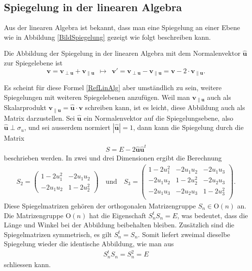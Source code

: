 \subsection{Spiegelung in der linearen Algebra}
Aus der linearen Algebra ist bekannt, dass man eine Spiegelung an einer Ebene wie in Abbildung \ref{BildSpiegelung} gezeigt wie folgt beschreiben kann.
\begin{definition}
	Die Abbildung der Spiegelung in der linearen Algebra mit dem Normalenvektor $\mathbf{\hat{u}}$ zur Spiegelebene ist
	\begin{equation} \label{RefLinAlg}
	\mathbf{v} = \mathbf{v_{\perp u}} + \mathbf{v_{\parallel u}} \enspace\mapsto\enspace \mathbf{v'} =  \mathbf{v_{\perp u}} - \mathbf{v_{\parallel u}} = \mathbf{v} - 2 \cdot \mathbf{v_{\parallel u}}.
	\end{equation}
\end{definition}
Es scheint für diese Formel \eqref{RefLinAlg} aber umständlich zu sein, weitere Spiegelungen mit weiteren Spiegelebenen anzufügen. Weil man $\mathbf{v_{\parallel u}}$ auch als Skalarprodukt $\mathbf{v_{\parallel u}} = \mathbf{\hat{u}} \cdot \mathbf{v}$ schreiben kann, ist es leicht, diese Abbildung auch als Matrix darzustellen. Sei $\mathbf{\hat{u}}$ ein Normalenvektor auf die Spiegelungsebene, also $\mathbf{\hat{u}}\perp \sigma_u$, und sei ausserdem normiert $|\mathbf{\hat{u}}| = 1$, dann kann die Spiegelung durch die Matrix
\begin{align*}
S = E - 2\mathbf{\hat{u}\hat{u}}^t
\end{align*}
beschrieben werden. In zwei und drei Dimensionen ergibt die Berechnung
\begin{align} \label{Spiegelmatrizen}
S_2 = \begin{pmatrix}
1-2u_1^2 & -2u_1u_2 \\
-2u_1u_2 & 1-2u_2^2
\end{pmatrix}\quad\text{und}\quad
S_3 = \begin{pmatrix}
1-2u_1^2 & -2u_1u_2 & -2u_1u_3\\
-2u_1u_2 & 1-2u_2^2 & -2u_2u_3\\
-2u_1u_3 & -2u_2u_3 & 1-2u_3^2\\
\end{pmatrix}.
\end{align}
Diese Spiegelmatrizen gehören der orthogonalen Matrizengruppe $S_n\in \text{O}(n)$ an.
%
Die Matrizengruppe $\text{O}(n)$ hat die Eigenschaft $S_n^t S_n = E$, was bedeutet, dass die Länge und Winkel bei der Abbildung beibehalten bleiben. Zusätzlich sind die Spiegelmatrizen symmetrisch, es gilt $S_n^t = S_n$. Somit liefert zweimal dieselbe Spiegelung wieder die identische Abbildung, wie man aus
\begin{align*}
S_n^t S_n = S_n^2 = E
\end{align*}
schliessen kann.

